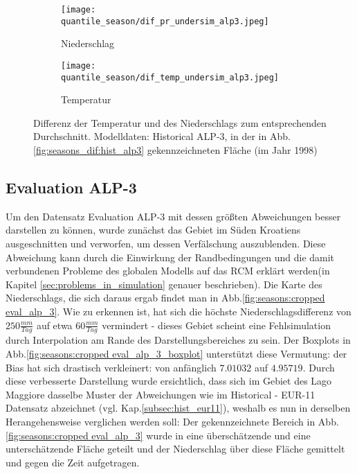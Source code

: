 \begin{figure}[h!]
	\begin{subfigure}{0.49\textwidth}
		\texttt{[image: quantile\_season/dif\_pr\_undersim\_alp3.jpeg]}
		\caption{Niederschlag}
	\end{subfigure}
	\begin{subfigure}{0.49\textwidth}
		\texttt{[image: quantile\_season/dif\_temp\_undersim\_alp3.jpeg]}
		\caption{Temperatur}
	\end{subfigure}
	\caption{Differenz der Temperatur und des Niederschlags zum entsprechenden Durchschnitt. Modelldaten: Historical ALP-3, in der in Abb.\ref{fig:seasons_dif:hist_alp3} gekennzeichneten Fläche (im Jahr 1998)}
	\label{fig:seasons:mean_alp3}
\end{figure}

\newpage
\subsection{Evaluation ALP-3}\label{subsec:eval_alp3}
Um den Datensatz Evaluation ALP-3 mit dessen größten Abweichungen besser darstellen zu können, wurde zunächst das Gebiet im Süden Kroatiens ausgeschnitten und verworfen, um dessen Verfälschung auszublenden. Diese Abweichung kann durch die Einwirkung der Randbedingungen und die damit verbundenen Probleme des globalen Modells auf das RCM erklärt werden(in Kapitel \ref{sec:problems_in_simulation} genauer beschrieben). Die Karte des Niederschlags, die sich daraus ergab findet man in Abb.\ref{fig:seasons:cropped eval_alp_3}. Wie zu erkennen ist, hat sich die höchste Niederschlagsdifferenz von $250\frac{mm}{Tag}$ auf etwa $60\frac{mm}{Tag}$ vermindert - dieses Gebiet scheint eine Fehlsimulation durch Interpolation am Rande des Darstellungsbereiches zu sein. Der Boxplots in Abb.\ref{fig:seasons:cropped eval_alp_3_boxplot} unterstützt diese Vermutung: der Bias hat sich drastisch verkleinert: von anfänglich $7.01032$ auf $4.95719$. Durch diese verbesserte Darstellung wurde ersichtlich, dass sich im Gebiet des Lago Maggiore dasselbe Muster der Abweichungen wie im Historical - EUR-11 Datensatz abzeichnet (vgl. Kap.\ref{subsec:hist_eur11}), weshalb es nun in derselben Herangehensweise verglichen werden soll: Der gekennzeichnete Bereich in Abb.\ref{fig:seasons:cropped eval_alp_3} wurde in eine überschätzende und eine unterschätzende Fläche geteilt und der Niederschlag über diese Fläche gemittelt und gegen die Zeit aufgetragen.\\

